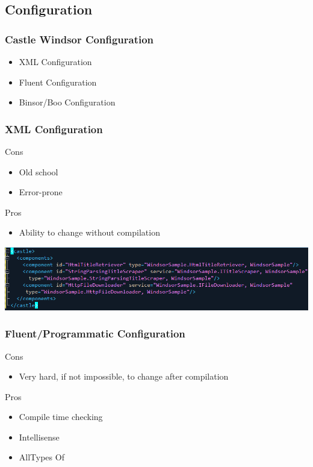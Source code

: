 \documentclass[turkish,handout]{beamer}
\begin{document}
	\subsection{Configuration}
		\frame
		{
			\frametitle{Castle Windsor Configuration}
			\begin{itemize}
				\item<1->XML Configuration
				\item<2->Fluent Configuration
				\item<3->Binsor/Boo Configuration
			\end{itemize}
		}
		\frame
		{
			\frametitle{XML Configuration}
			\begin{block}{Cons}
				\begin{itemize}
					\item<1->Old school
					\item<2->Error-prone
				\end{itemize}
			\end{block}
			\begin{block}{Pros}
				\begin{itemize}
				  \item<3->Ability to change without compilation
				\end{itemize}
			\end{block}
	
			\begin{center}
				\includegraphics[scale=0.40]{images/xmlconfiguration.png}
			\end{center}
		}
	  \frame
		{
			\frametitle{Fluent/Programmatic Configuration}
			\begin{block}{Cons}
				\begin{itemize}
					\item<1->Very hard, if not impossible, to change after compilation
				\end{itemize}
			\end{block}
			\begin{block}{Pros}
				\begin{itemize}
					\item<2->Compile time checking
					\item<3->Intellisense
					\item<4->AllTypes Of
				\end{itemize}
			\end{block}
		}
\end{document}

